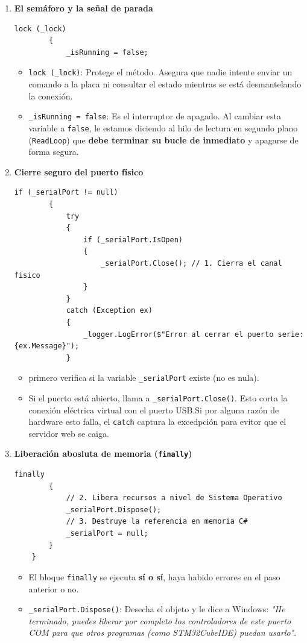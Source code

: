 \documentclass[
10pt, %
a4paper, %
oneside, %
headinclude,footinclude, %
BCOR5mm, %
]{scrartcl}
\begin{document}
\begin{enumerate}
	\item \textbf{El semáforo y la señal de parada}
	\begin{lstlisting}[style=VSCodeDark]
		lock (_lock)
		{
			_isRunning = false;\end{lstlisting}
	\begin{itemize}
		\item \texttt{lock (\_lock)}: Protege el método. Asegura que nadie intente enviar un comando a la placa ni consultar el estado mientras se está desmantelando la conexión.
		\item \texttt{\_isRunning = false}: Es el interruptor de apagado. Al cambiar esta variable a \texttt{false}, le estamos diciendo al hilo de lectura en segundo plano (\texttt{ReadLoop}) que \textbf{debe terminar su bucle de inmediato} y apagarse de forma segura.
	\end{itemize}
	\item \textbf{Cierre seguro del puerto físico}
	\begin{lstlisting}[style=VSCodeDark]
		if (_serialPort != null)
		{
			try
			{
				if (_serialPort.IsOpen)
				{
					_serialPort.Close(); // 1. Cierra el canal fisico
				}
			}
			catch (Exception ex)
			{
				_logger.LogError($"Error al cerrar el puerto serie: {ex.Message}");
			}
	\end{lstlisting}
	\begin{itemize}
		\item primero verifica si la variable \texttt{\_serialPort} existe (no es nula).
		\item Si el puerto está abierto, llama a \texttt{\_serialPort.Close()}. Esto corta la conexión eléctrica virtual con el puerto USB.Si por alguna razón de hardware esto falla, el \texttt{catch} captura la excedpción para evitor que el servidor web se caiga.
	\end{itemize}
	\item \textbf{Liberación abosluta de memoria (\texttt{finally})}
	\begin{lstlisting}[style=VSCodeDark]
	finally
		{
			// 2. Libera recursos a nivel de Sistema Operativo
			_serialPort.Dispose(); 
			// 3. Destruye la referencia en memoria C#
			_serialPort = null;    
		}
	}
	\end{lstlisting}
	\begin{itemize}
		\item El bloque \texttt{finally} se ejecuta \textbf{sí o sí}, haya habido errores en el paso anterior o no.
		\item \texttt{\_serialPort.Dispose()}: Desecha el objeto y le dice a Windows: \textit{"He terminado, puedes liberar por completo los controladores de este puerto COM para que otros programas (como STM32CubeIDE) puedan usarlo"}.

\end{itemize}
\end{enumerate}
\end{document}
